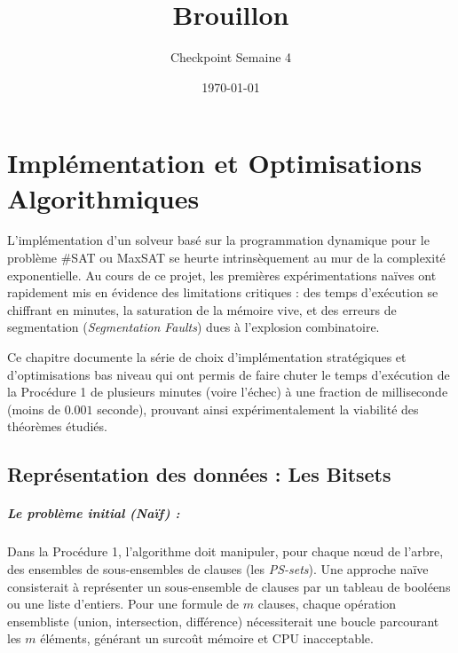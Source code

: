 \documentclass[11pt,a4paper]{report}
\title{Brouillon}
\author{Checkpoint Semaine 4}
\date{\today}
\begin{document}
\maketitle


\chapter*{Implémentation et Optimisations Algorithmiques}
\label{chap:implementation_optimisations}

L'implémentation d'un solveur basé sur la programmation dynamique pour le problème \#SAT ou MaxSAT se heurte intrinsèquement au mur de la complexité exponentielle. Au cours de ce projet, les premières expérimentations naïves ont rapidement mis en évidence des limitations critiques : des temps d'exécution se chiffrant en minutes, la saturation de la mémoire vive, et des erreurs de segmentation (\textit{Segmentation Faults}) dues à l'explosion combinatoire. 

Ce chapitre documente la série de choix d'implémentation stratégiques et d'optimisations bas niveau qui ont permis de faire chuter le temps d'exécution de la Procédure 1 de plusieurs minutes (voire l'échec) à une fraction de milliseconde (moins de $0.001$ seconde), prouvant ainsi expérimentalement la viabilité des théorèmes étudiés.

\section*{Représentation des données : Les Bitsets}

\paragraph{Le problème initial (Naïf) :}
Dans la Procédure 1, l'algorithme doit manipuler, pour chaque nœud de l'arbre, des ensembles de sous-ensembles de clauses (les \textit{PS-sets}). Une approche naïve consisterait à représenter un sous-ensemble de clauses par un tableau de booléens ou une liste d'entiers. Pour une formule de $m$ clauses, chaque opération ensembliste (union, intersection, différence) nécessiterait une boucle parcourant les $m$ éléments, générant un surcoût mémoire et CPU inacceptable.
\end{document}
